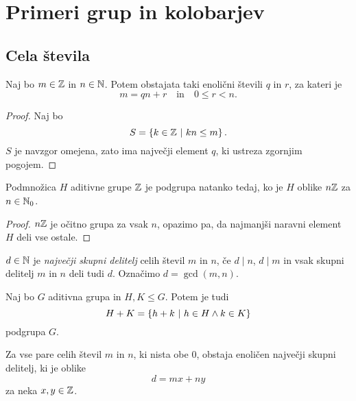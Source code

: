 \section{Primeri grup in kolobarjev}

\subsection{Cela števila}

\begin{izrek}
Naj bo $m \in \mathbb{Z}$ in $n \in \mathbb{N}$. Potem obstajata taki enolični
števili $q$ in $r$, za kateri je
\[
m = qn + r \quad \text{in} \quad 0 \leq r < n.
\]
\end{izrek}

\begin{proof}
Naj bo
\[
S = \left\{k \in \mathbb{Z}~\middle\vert~kn \leq m\right\}.
\]
$S$ je navzgor omejena, zato ima največji element $q$, ki ustreza
zgornjim pogojem.
\end{proof}

\begin{posledica}
Podmnožica $H$ aditivne grupe $\mathbb{Z}$ je podgrupa natanko tedaj, ko je
$H$ oblike $n \mathbb{Z}$ za $n \in \mathbb{N}_0$.
\end{posledica}

\begin{proof}
$n \mathbb{Z}$ je očitno grupa za vsak $n$, opazimo pa, da najmanjši
naravni element $H$ deli vse ostale.
\end{proof}

\begin{definicija}
$d \in \mathbb{N}$ je
\emph{največji skupni delitelj}
celih števil $m$ in $n$, če $d \mid n$, $d \mid m$ in vsak skupni
delitelj $m$ in $n$ deli tudi $d$. Označimo $d = \gcd(m,n)$.
\end{definicija}

\begin{trditev}
Naj bo $G$ aditivna grupa in $H, K \leq G$. Potem je tudi
\[
H + K = \left\{h + k~\middle\vert~h \in H \land k \in K\right\}
\]
podgrupa $G$.
\end{trditev}

\obvs

\begin{posledica}
Za vse pare celih števil $m$ in $n$, ki nista obe $0$, obstaja
enoličen največji skupni delitelj, ki je oblike
\[
d = mx + ny
\]
za neka $x, y \in \mathbb{Z}$.
\end{posledica}

